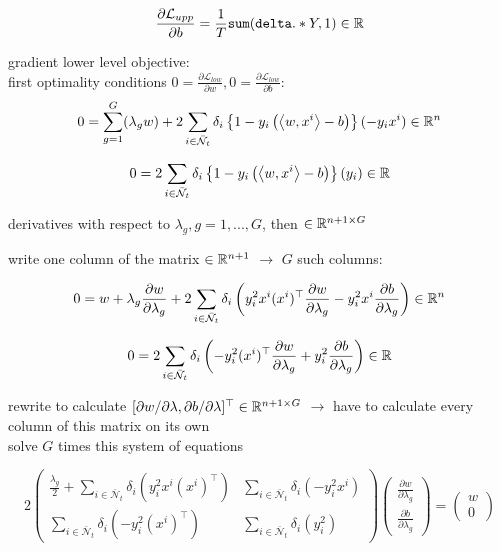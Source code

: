 	\[ \frac{\partial \mathcal{L}_{upp}}{\partial b} = \frac{1}{T}\texttt{sum}(\texttt{delta}.*Y ,1) \in \mathbb{R}\]
	
	
gradient lower level objective:\\
first optimality conditions \(0 = \frac{\partial \mathcal{L}_{low}}{\partial w}, 0 = \frac{\partial \mathcal{L}_{low}}{\partial b}\):
	\[ 0 = {\sum_{g = 1}^G(\lambda_g}w) + 2\sum_{i \in \bar{\mathcal{N}}_t}\delta_i \left\{1-y_i\left(\left\langle w,x^i\right\rangle -b\right) \right\}(-y_ix^i) \in \mathbb{R}^n \]
		
	\[0 = 2\sum_{i \in \bar{\mathcal{N}}_t}\delta_i \left\{1-y_i\left(\left\langle w,x^i\right\rangle -b\right) \right\}(y_i) \in \mathbb{R} \]
	
	derivatives with respect to \(\lambda_g, g = 1,...,G\), then \(\in \mathbb{R}^{n+1 \times G}\)
	
	write one column of the matrix \(\in \mathbb{R}^{n+1}\) \(\to\) \(G\) such columns:
	
	\[ 0 = w + \lambda_g\frac{\partial w}{\partial \lambda_g} + 2 \sum_{i \in  \bar{\mathcal{N}}_t} \delta_i \left(y_i^2x^i(x^i)^{\top}\frac{\partial w}{\partial \lambda_g} - y_i^2x^i \frac{\partial b}{\partial \lambda_g}\right) \in \mathbb{R}^n \]
	
	\[ 0 = 2\sum_{i \in  \bar{\mathcal{N}}_t} \delta_i \left(-y_i^2(x^i)^{\top} \frac{\partial w}{\partial \lambda_g} + y_i^2 \frac{\partial b}{\partial \lambda_g}\right) \in \mathbb{R}\] 


	rewrite to calculate \([\partial w / \partial \lambda, \partial b / \partial \lambda]^{\top} \in \mathbb{R}^{n+1 \times G}\) \(\to\) have to calculate every column of this matrix on its own \\
	solve \(G\) times this system of equations
	
	\[ 2\begin{pmatrix} \frac{\lambda_g}{2}+\sum_{i \in  \bar{\mathcal{N}}_t}{\delta_i(y_i^2x^i(x^i)^{\top})} &  \sum_{i \in  \bar{\mathcal{N}}_t} \delta_i (- y_i^2x^i )	\\
	\sum_{i \in  \bar{\mathcal{N}}_t} \delta_i (-y_i^2(x^i)^{\top}) & \sum_{i \in  \bar{\mathcal{N}}_t} \delta_i (y_i^2 )
	\end{pmatrix} 
	\begin{pmatrix}	\frac{\partial w}{\partial \lambda_g} \\ \frac{\partial b}{\partial \lambda_g}
	\end{pmatrix} 
	= \begin{pmatrix} w \\ 0	\end{pmatrix} \]





